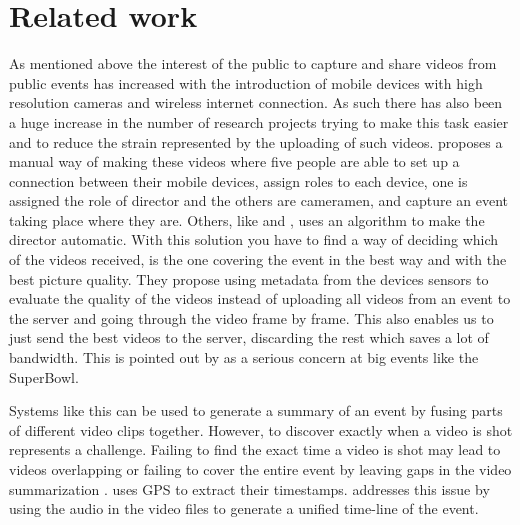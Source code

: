 \documentclass[conference]{IEEEtran}
\begin{document}
\section{Related work}
As mentioned above the interest of the public to capture and share videos from public events has increased with the introduction of mobile devices with high resolution cameras and wireless internet connection. As such there has also been a huge increase in the number of research projects trying to make this task easier and to reduce the strain represented by the uploading of such videos. \cite{engstrom_mobile_2012} proposes a manual way of making these videos where five people are able to set up a connection between their mobile devices, assign roles to each device, one is assigned the role of director and the others are cameramen, and capture an event taking place where they are.
Others, like \cite{seshadri_demand_2014} and \cite{shrestha_automatic_2010}, uses an algorithm to make the director automatic. With this solution you have to find a way of deciding which of the videos received, is the one covering the event in the best way and with the best picture quality. They propose using metadata from the devices sensors to evaluate the quality of the videos instead of uploading all videos from an event to the server and going through the video frame by frame. This also enables us to just send the best videos to the server, discarding the rest which saves a lot of bandwidth. This is pointed out by \cite{seshadri_demand_2014} as a serious concern at big events like the SuperBowl.

Systems like this can be used to generate a summary of an event by fusing parts of different video clips together. However, to discover exactly when a video is shot represents a challenge. Failing to find the exact time a video is shot may lead to videos overlapping or failing to cover the entire event by leaving gaps in the video summarization \cite{shrestha_automatic_2010}. \cite{jain_focus:_2013} uses GPS to extract their timestamps. \cite{shrestha_automatic_2010} addresses this issue by using the audio in the video files to generate a unified time-line of the event. 
\end{document}
